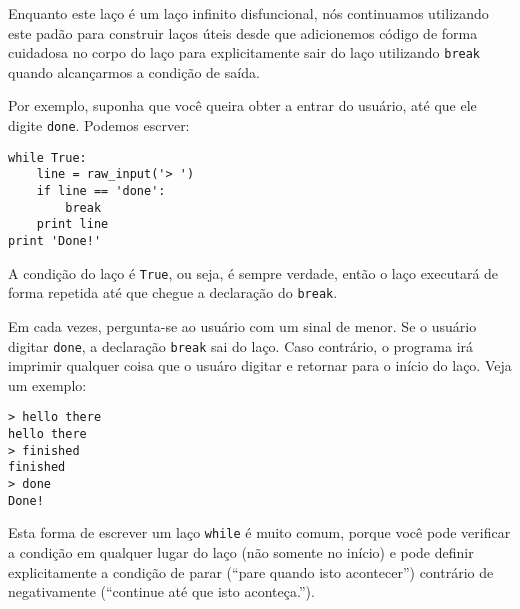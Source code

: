 Enquanto este laço é um laço infinito disfuncional, nós continuamos utilizando
este padão para construir laços úteis desde que adicionemos código de forma
cuidadosa no corpo do laço para explicitamente sair do laço utilizando 
{\tt break} quando alcançarmos a condição de saída.


Por exemplo, suponha que você queira obter a entrar do usuário, até que ele
digite {\tt done}. Podemos escrver:

\beforeverb
\begin{verbatim}
while True:
    line = raw_input('> ')
    if line == 'done':
        break
    print line
print 'Done!'
\end{verbatim}
\afterverb
%

%
A condição do laço é {\tt True}, ou seja, é sempre verdade, então o laço
executará de forma repetida até que chegue a declaração do {\tt break}.


Em cada vezes, pergunta-se ao usuário com um sinal de menor. Se o usuário
digitar {\tt done}, a declaração {\tt break} sai do laço. Caso contrário, o
programa irá imprimir qualquer coisa que o usuáro digitar e retornar para o
início do laço. Veja um exemplo:

\beforeverb
\begin{verbatim}
> hello there
hello there
> finished
finished
> done
Done!
\end{verbatim}
\afterverb
%

%
Esta forma de escrever um laço {\tt while} é muito comum, porque você pode
verificar a condição em qualquer lugar do laço (não somente no início) e
pode definir explicitamente a condição de parar (``pare quando isto acontecer'')
contrário de negativamente (``continue até que isto aconteça.'').

